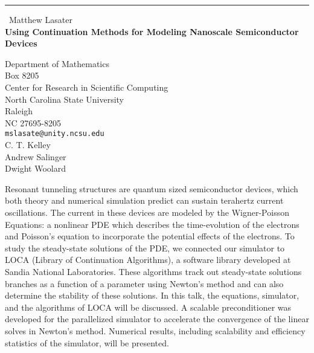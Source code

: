 \documentclass{report}
\begin{document}
\begin{center}
\rule{6in}{1pt} \
{\large Matthew Lasater \\
{\bf Using Continuation Methods for Modeling Nanoscale Semiconductor Devices}}

Department of Mathematics \\ Box 8205 \\ Center for Research in Scientific Computing \\ North Carolina State University \\ Raleigh \\ NC  27695-8205
\\
{\tt mslasate@unity.ncsu.edu}\\
C. T. Kelley\\
Andrew Salinger\\
	Dwight Woolard\end{center}

Resonant tunneling structures are quantum sized semiconductor devices,
which both theory and numerical simulation predict can sustain terahertz
current oscillations. The current in these devices are modeled by the
Wigner-Poisson Equations: a nonlinear PDE which describes the
time-evolution of the electrons and Poisson's equation to incorporate the
potential effects of the electrons. To study the steady-state solutions
of the PDE, we connected our simulator to LOCA (Library of Continuation
Algorithms), a software library developed at Sandia National
Laboratories. These algorithms track out steady-state solutions branches
as a function of a parameter using Newton's method and can also determine
the stability of these solutions.
In this talk, the equations, simulator, and the algorithms of LOCA will
be discussed. A scalable preconditioner was developed for the
parallelized simulator to accelerate the convergence of the linear solves
in Newton's method. Numerical results, including scalability and
efficiency statistics of the simulator,
will be presented.
\end{document}
